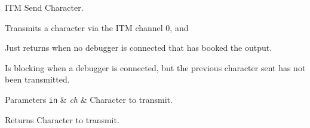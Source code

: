 I\-T\-M Send Character. 

Transmits a character via the I\-T\-M channel 0, and \begin{DoxyItemize}
\item Just returns when no debugger is connected that has booked the output. \item Is blocking when a debugger is connected, but the previous character sent has not been transmitted. 
\begin{DoxyParams}[1]{Parameters}
\mbox{\tt in}  & {\em ch} & Character to transmit. \\
\hline
\end{DoxyParams}
\begin{DoxyReturn}{Returns}
Character to transmit. 
\end{DoxyReturn}
\end{DoxyItemize}


